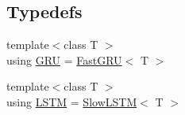 \subsection*{Typedefs}
\begin{DoxyCompactItemize}
\item 
{\footnotesize template$<$class T $>$ }\\using \hyperlink{namespaceamunmt_1_1GPU_aef4855cf4b6eab614a38b158bda76705}{G\+RU} = \hyperlink{classamunmt_1_1GPU_1_1FastGRU}{Fast\+G\+RU}$<$ T $>$
\item 
{\footnotesize template$<$class T $>$ }\\using \hyperlink{namespaceamunmt_1_1GPU_a5da1f5e1c7dfe4068d4a79ae464191d7}{L\+S\+TM} = \hyperlink{classamunmt_1_1GPU_1_1SlowLSTM}{Slow\+L\+S\+TM}$<$ T $>$
\end{DoxyCompactItemize}
